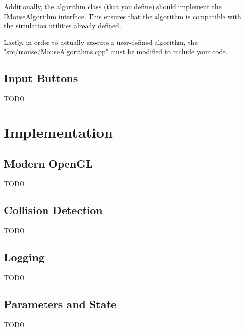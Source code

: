 \documentclass[12pt]{article}
\begin{document}
Additionally, the algorithm class (that you define) should implement the
IMouseAlgorithm interface. This ensures that the algorithm is compatible with
the simulation utilities already defined.

Lastly, in order to actually execute a user-defined algorithm, the
"src/mouse/MouseAlgorithms.cpp" must be modified to include your code.

\subsection{Input Buttons}

TODO

\section{Implementation}


\subsection{Modern OpenGL}
TODO

\subsection{Collision Detection}
TODO

\subsection{Logging}
TODO

\subsection{Parameters and State}
TODO

%
%
%
%
%
%
%
%
%
%
%    
%
%
%
\end{document}
